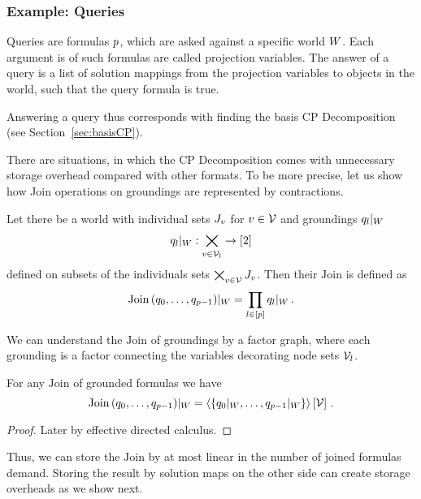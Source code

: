 \subsubsection{Example: Queries}

Queries are formulas $p$, which are asked against a specific world $W$.
Each argument is of such formulas are called projection variables.
The answer of a query is a list of solution mappings from the projection variables to objects in the world, such that the query formula is true.

Answering a query thus corresponds with finding the basis CP Decomposition (see Section~\ref{sec:basisCP}).

There are situations, in which the CP Decomposition comes with unnecessary storage overhead compared with other formats.
To be more precise, let us show how Join operations on groundings are represented by contractions.

\begin{definition}
	Let there be a world with individual sets $J_v$ for $v\in\mathcal{V}$ and groundings ${q_{l}}|_{W}$ 
		\[ {q_{l}}|_{W}: \bigtimes_{v\in\mathcal{V}_l} \rightarrow [2] \]
	defined on subsets of the individuals sets $\bigtimes_{v\in\mathcal{V}}J_v$.
	Then their $\mathrm{Join}$ is defined as
		\[ {\mathrm{Join}\left(q_{0},\ldots,q_{p-1} \right)}|_{W} = \prod_{l\in[p]} {q_{l}}|_{W} \, .\]
\end{definition}

We can understand the $\mathrm{Join}$ of groundings by a factor graph, where each grounding is a factor connecting the variables decorating node sets $\mathcal{V}_l$.


\begin{theorem}
	For any $\mathrm{Join}$ of grounded formulas we have
		\[ {\mathrm{Join}\left(q_{0},\ldots,q_{p-1} \right)}|_{W} = 
		\left\langle \{{q_{0}}|_{W},\ldots,{q_{p-1}}|_{W}\}\right\rangle \left[ \mathcal{V} \right] \, . \]
\end{theorem}
\begin{proof}
	Later by effective directed calculus.
\end{proof}

Thus, we can store the $\mathrm{Join}$ by at most linear in the number of joined formulas demand.
Storing the result by solution maps on the other side can create storage overheads as we show next.


